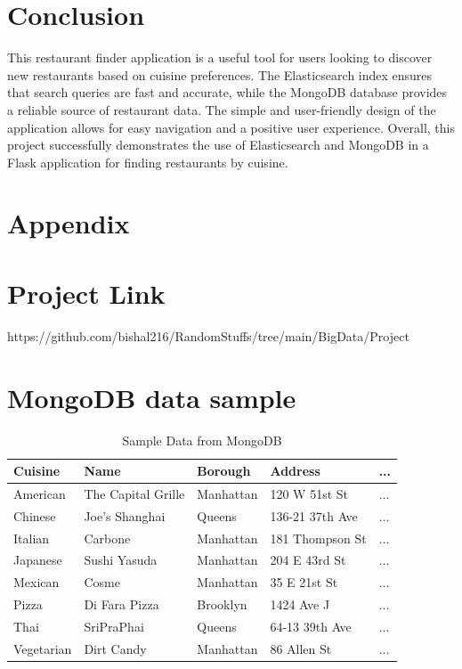 \documentclass[12pt]{article}
\begin{document}
\section{Conclusion}
This restaurant finder application is a useful tool for users looking to discover new restaurants based on cuisine preferences. The Elasticsearch index ensures that search queries are fast and accurate, while the MongoDB database provides a reliable source of restaurant data. The simple and user-friendly design of the application allows for easy navigation and a positive user experience. Overall, this project successfully demonstrates the use of Elasticsearch and MongoDB in a Flask application for finding restaurants by cuisine.

\section{Appendix}
\appendix
\section{Project Link}
https://github.com/bishal216/RandomStuffs/tree/main/BigData/Project

\section{MongoDB data sample}
\begin{table}[h!]
    \centering
    \begin{tabular}{lllll}
        \hline
        \textbf{Cuisine} & \textbf{Name} & \textbf{Borough} & \textbf{Address} & \textbf{...} \\ \hline
        American & The Capital Grille & Manhattan & 120 W 51st St & ... \\
        Chinese & Joe's Shanghai & Queens & 136-21 37th Ave & ... \\
        Italian & Carbone & Manhattan & 181 Thompson St & ... \\
        Japanese & Sushi Yasuda & Manhattan & 204 E 43rd St & ... \\
        Mexican & Cosme & Manhattan & 35 E 21st St & ... \\
        Pizza & Di Fara Pizza & Brooklyn & 1424 Ave J & ... \\
        Thai & SriPraPhai & Queens & 64-13 39th Ave & ... \\
        Vegetarian & Dirt Candy & Manhattan & 86 Allen St & ... \\ \hline
        \end{tabular}
        \caption{Sample Data from MongoDB}
    \end{table}
\end{document}
